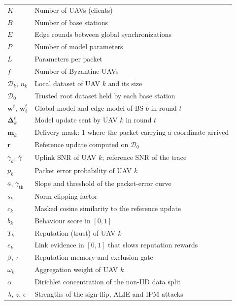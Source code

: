 \begin{longtable}{@{\hspace{12mm}}p{28mm}p{114mm}@{}}
$K$ & Number of UAVs (clients) \\
$B$ & Number of base stations \\
$E$ & Edge rounds between global synchronizations \\
$P$ & Number of model parameters \\
$L$ & Parameters per packet \\
$f$ & Number of Byzantine UAVs \\
$\mathcal{D}_k$, $n_k$ & Local dataset of UAV $k$ and its size \\
$\mathcal{D}_0$ & Trusted root dataset held by each base station \\
$\mathbf{w}^t$, $\mathbf{w}^t_b$ & Global model and edge model of BS $b$ in round $t$ \\
$\boldsymbol{\Delta}_k^t$ & Model update sent by UAV $k$ in round $t$ \\
$\mathbf{m}_k$ & Delivery mask: 1 where the packet carrying a coordinate arrived \\
$\mathbf{r}$ & Reference update computed on $\mathcal{D}_0$ \\
$\gamma_k$, $\bar\gamma$ & Uplink SNR of UAV $k$; reference SNR of the trace \\
$p_k$ & Packet error probability of UAV $k$ \\
$a$, $\gamma_{\mathrm{th}}$ & Slope and threshold of the packet-error curve \\
$s_k$ & Norm-clipping factor \\
$c_k$ & Masked cosine similarity to the reference update \\
$b_k$ & Behaviour score in $[0,1]$ \\
$T_k$ & Reputation (trust) of UAV $k$ \\
$e_k$ & Link evidence in $[0,1]$ that slows reputation rewards \\
$\beta$, $\tau$ & Reputation memory and exclusion gate \\
$\omega_k$ & Aggregation weight of UAV $k$ \\
$\alpha$ & Dirichlet concentration of the non-IID data split \\
$\lambda$, $z$, $\epsilon$ & Strengths of the sign-flip, ALIE and IPM attacks \\
\end{longtable}
